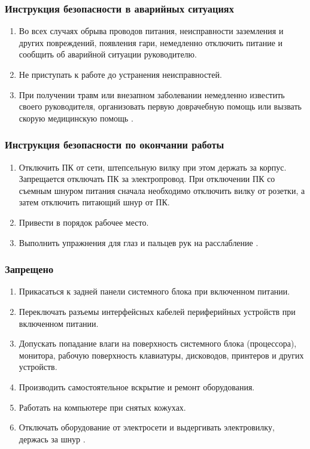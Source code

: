 \subsubsection{Инструкция безопасности в аварийных ситуациях}
\begin{enumerate}
\item Во всех случаях обрыва проводов питания, неисправности заземления и других повреждений, появления гари, немедленно отключить питание и сообщить об аварийной ситуации руководителю.
\item Не приступать к работе до устранения неисправностей.
\item При получении травм или внезапном заболевании немедленно известить своего руководителя, организовать первую доврачебную помощь или вызвать скорую медицинскую помощь \cite{bhzd_3}.
\end{enumerate}

\subsubsection{Инструкция безопасности по окончании работы}
\begin{enumerate}
\item Отключить ПК от сети, штепсельную вилку при этом держать за корпус. Запрещается отключать ПК за электропровод. При отключении ПК со съемным шнуром питания сначала необходимо отключить вилку от розетки, а затем отключить питающий шнур от ПК.
\item Привести в порядок рабочее место.
\item Выполнить упражнения для глаз и пальцев рук на расслабление \cite{bhzd_3}.
\end{enumerate}

\subsubsection{Запрещено}
\begin{enumerate}
\item Прикасаться к задней панели системного блока при включенном питании.
\item Переключать разъемы интерфейсных кабелей периферийных устройств при включенном питании.
\item Допускать попадание влаги на поверхность системного блока (процессора), монитора, рабочую поверхность клавиатуры, дисководов, принтеров и других устройств.
\item Производить самостоятельное вскрытие и ремонт оборудования.
\item Работать на компьютере при снятых кожухах.
\item Отключать оборудование от электросети и выдергивать электровилку, держась за шнур \cite{bhzd_3}.
\end{enumerate}